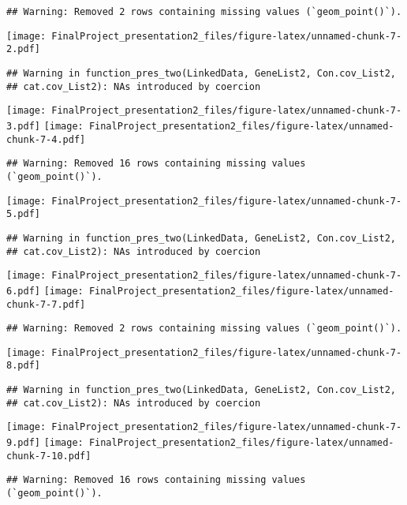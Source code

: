 \documentclass[
]{article}
\begin{document}
\begin{verbatim}
## Warning: Removed 2 rows containing missing values (`geom_point()`).
\end{verbatim}

\texttt{[image: FinalProject\_presentation2\_files/figure-latex/unnamed-chunk-7-2.pdf]}

\begin{verbatim}
## Warning in function_pres_two(LinkedData, GeneList2, Con.cov_List2,
## cat.cov_List2): NAs introduced by coercion
\end{verbatim}

\texttt{[image: FinalProject\_presentation2\_files/figure-latex/unnamed-chunk-7-3.pdf]}
\texttt{[image: FinalProject\_presentation2\_files/figure-latex/unnamed-chunk-7-4.pdf]}

\begin{verbatim}
## Warning: Removed 16 rows containing missing values (`geom_point()`).
\end{verbatim}

\texttt{[image: FinalProject\_presentation2\_files/figure-latex/unnamed-chunk-7-5.pdf]}

\begin{verbatim}
## Warning in function_pres_two(LinkedData, GeneList2, Con.cov_List2,
## cat.cov_List2): NAs introduced by coercion
\end{verbatim}

\texttt{[image: FinalProject\_presentation2\_files/figure-latex/unnamed-chunk-7-6.pdf]}
\texttt{[image: FinalProject\_presentation2\_files/figure-latex/unnamed-chunk-7-7.pdf]}

\begin{verbatim}
## Warning: Removed 2 rows containing missing values (`geom_point()`).
\end{verbatim}

\texttt{[image: FinalProject\_presentation2\_files/figure-latex/unnamed-chunk-7-8.pdf]}

\begin{verbatim}
## Warning in function_pres_two(LinkedData, GeneList2, Con.cov_List2,
## cat.cov_List2): NAs introduced by coercion
\end{verbatim}

\texttt{[image: FinalProject\_presentation2\_files/figure-latex/unnamed-chunk-7-9.pdf]}
\texttt{[image: FinalProject\_presentation2\_files/figure-latex/unnamed-chunk-7-10.pdf]}

\begin{verbatim}
## Warning: Removed 16 rows containing missing values (`geom_point()`).
\end{verbatim}
\end{document}
